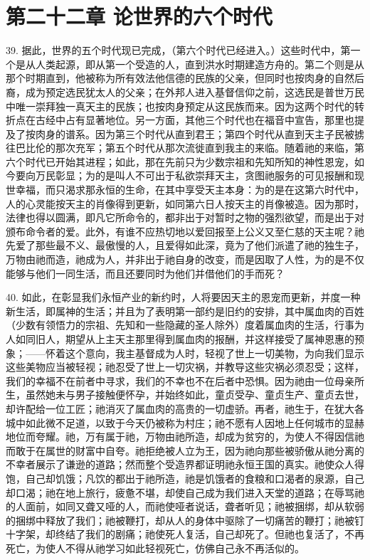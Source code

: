 
\section{第二十二章 论世界的六个时代}

39. 据此，世界的五个时代现已完成，（第六个时代已经进入。）这些时代中，第一个是从人类起源，即从第一个受造的人，直到洪水时期建造方舟的。第二个则是从那个时期直到，他被称为所有效法他信德的民族的父亲，但同时也按肉身的自然后裔，成为预定选民犹太人的父亲；在外邦人进入基督信仰之前，这选民是普世万民中唯一崇拜独一真天主的民族；也按肉身预定从这民族而来。因为这两个时代的转折点在古经中占有显著地位。另一方面，其他三个时代也在福音中宣告，那里也提及了按肉身的谱系。因为第三个时代从直到君王；第四个时代从直到天主子民被掳往巴比伦的那次充军；第五个时代从那次流徙直到我主的来临。随着祂的来临，第六个时代已开始其进程；如此，那在先前只为少数宗祖和先知所知的神性恩宠，如今要向万民彰显；为的是叫人不可出于私欲崇拜天主，贪图祂服务的可见报酬和现世幸福，而只渴求那永恒的生命，在其中享受天主本身：为的是在这第六时代中，人的心灵能按天主的肖像得到更新，如同第六日人按天主的肖像被造。因为那时，法律也得以圆满，即凡它所命令的，都非出于对暂时之物的强烈欲望，而是出于对颁布命令者的爱。此外，有谁不应热切地以爱回报至上公义又至仁慈的天主呢？祂先爱了那些最不义、最傲慢的人，且爱得如此深，竟为了他们派遣了祂的独生子，万物由祂而造，祂成为人，并非出于祂自身的改变，而是因取了人性，为的是不仅能够与他们一同生活，而且还要同时为他们并借他们的手而死？\par

40. 如此，在彰显我们永恒产业的新约时，人将要因天主的恩宠而更新，并度一种新生活，即属神的生活；并且为了表明第一部约是旧约的安排，其中属血肉的百姓（少数有领悟力的宗祖、先知和一些隐藏的圣人除外）度着属血肉的生活，行事为人如同旧人，期望从上主天主那里得到属血肉的报酬，并这样接受了属神恩惠的预象；——怀着这个意向，我主基督成为人时，轻视了世上一切美物，为向我们显示这些美物应当被轻视；祂忍受了世上一切灾祸，并教导这些灾祸必须忍受；这样，我们的幸福不在前者中寻求，我们的不幸也不在后者中恐惧。因为祂由一位母亲所生，虽然她未与男子接触便怀孕，并始终如此，童贞受孕、童贞生产、童贞去世，却许配给一位工匠；祂消灭了属血肉的高贵的一切虚骄。再者，祂生于，在犹大各城中如此微不足道，以致于今天仍被称为村庄；祂不愿有人因地上任何城市的显赫地位而夸耀。祂，万有属于祂，万物由祂所造，却成为贫穷的，为使人不得因信祂而敢于在属世的财富中自夸。祂拒绝被人立为王，因为祂向那些被骄傲从祂分离的不幸者展示了谦逊的道路；然而整个受造界都证明祂永恒王国的真实。祂使众人得饱，自己却饥饿；凡饮的都出于祂所造，祂是饥饿者的食粮和口渴者的泉源，自己却口渴；祂在地上旅行，疲惫不堪，却使自己成为我们进入天堂的道路；在辱骂祂的人面前，如同又聋又哑的人，而祂使哑者说话，聋者听见；祂被捆绑，却从软弱的捆绑中释放了我们；祂被鞭打，却从人的身体中驱除了一切痛苦的鞭打；祂被钉十字架，却终结了我们的剧痛；祂使死人复活，自己却死了。但祂也复活了，不再死亡，为使人不得从祂学习如此轻视死亡，仿佛自己永不再活似的。\par

